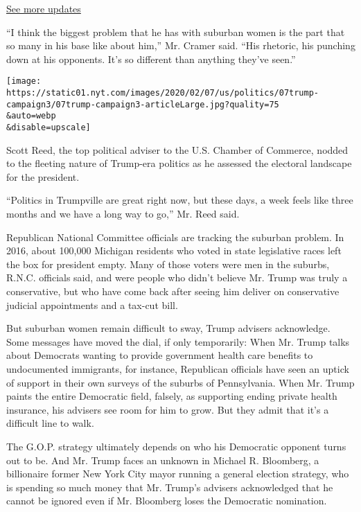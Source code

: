 \href{https://www.nytimes.com/2020/07/31/us/elections/biden-vs-trump.html?action=click\&pgtype=Article\&state=default\&region=MAIN_CONTENT_1\&context=storylines_live_updates}{See
more updates}

``I think the biggest problem that he has with suburban women is the
part that so many in his base like about him,'' Mr. Cramer said. ``His
rhetoric, his punching down at his opponents. It's so different than
anything they've seen.''

\texttt{[image: https://static01.nyt.com/images/2020/02/07/us/politics/07trump-campaign3/07trump-campaign3-articleLarge.jpg?quality=75\\\&auto=webp\\\&disable=upscale]}

Scott Reed, the top political adviser to the U.S. Chamber of Commerce,
nodded to the fleeting nature of Trump-era politics as he assessed the
electoral landscape for the president.

``Politics in Trumpville are great right now, but these days, a week
feels like three months and we have a long way to go,'' Mr. Reed said.

Republican National Committee officials are tracking the suburban
problem. In 2016, about 100,000 Michigan residents who voted in state
legislative races left the box for president empty. Many of those voters
were men in the suburbs, R.N.C. officials said, and were people who
didn't believe Mr. Trump was truly a conservative, but who have come
back after seeing him deliver on conservative judicial appointments and
a tax-cut bill.

But suburban women remain difficult to sway, Trump advisers acknowledge.
Some messages have moved the dial, if only temporarily: When Mr. Trump
talks about Democrats wanting to provide government health care benefits
to undocumented immigrants, for instance, Republican officials have seen
an uptick of support in their own surveys of the suburbs of
Pennsylvania. When Mr. Trump paints the entire Democratic field,
falsely, as supporting ending private health insurance, his advisers see
room for him to grow. But they admit that it's a difficult line to walk.

The G.O.P. strategy ultimately depends on who his Democratic opponent
turns out to be. And Mr. Trump faces an unknown in Michael R. Bloomberg,
a billionaire former New York City mayor running a general election
strategy, who is spending so much money that Mr. Trump's advisers
acknowledged that he cannot be ignored even if Mr. Bloomberg loses the
Democratic nomination.


